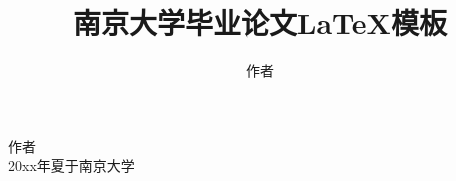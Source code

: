 \documentclass[winfonts,bachelor,twoside]{njuthesis}
\title{南京大学毕业论文\LaTeX 模板}
\author{作者}
\institute{南京大学}
\begin{document}

\maketitle
\makeenglishtitle


\frontmatter

\begin{abstract}
\lipsum[1-2]


\end{abstract}

\begin{englishabstract}
\lipsum[2]


\end{englishabstract}

%
\begin{preface}
\lipsum[1]
\vspace{1cm}
\begin{flushright}
作者\\
20xx年夏于南京大学
\end{flushright}

\end{preface}

\tableofcontents

\listoffigures

\listoftables
\end{document}
